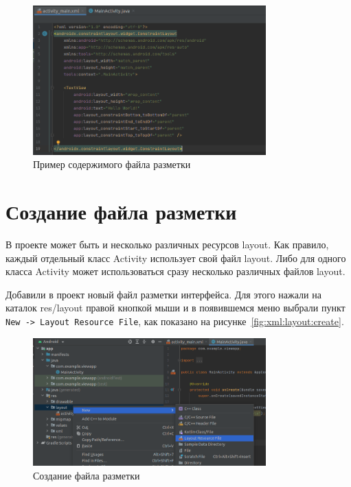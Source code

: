 \begin{figure}[h!tp]
	\centering
	\includegraphics[width=0.8\textwidth]{Screenshot from 2023-03-09 17-29-58.png}
	\caption{Пример содержимого файла разметки}
	\label{fig:xml:layout:d}
\end{figure}

\section{Создание файла разметки}
В проекте может быть и несколько различных ресурсов layout. Как правило,
каждый отдельный класс Activity использует свой файл layout. Либо для
одного класса Activity может использоваться сразу несколько различных
файлов layout.\par
Добавили в проект новый файл разметки интерфейса. Для этого
нажали на каталок res/layout правой кнопкой мыши и в появившемся меню
выбрали пункт \texttt{New -> Layout Resource File}, как показано
на рисунке~\ref{fig:xml:layout:create}.

\begin{figure}[h!tp]
	\centering
	\includegraphics[width=0.8\textwidth]{Screenshot from 2023-03-10 11-25-24.png}
	\caption{Создание файла разметки}
	\label{fig:xml:layout::create}
\end{figure}

